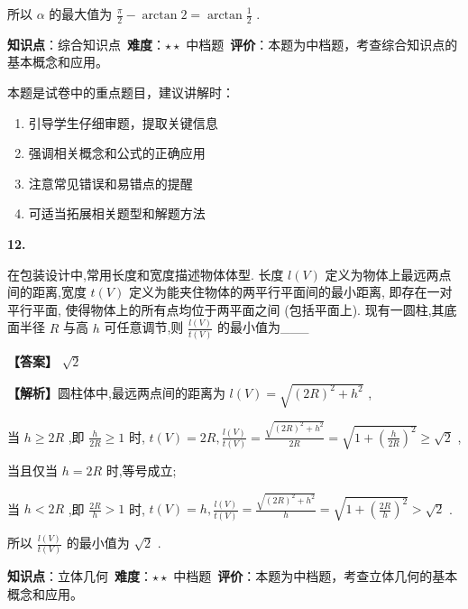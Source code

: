 \documentclass[10pt]{article}
\newenvironment{questionblock}[1]{%
  \needspace{3\baselineskip}%
  \noindent\textbf{#1.}%
}{%
  \par\vspace{1em}%
}
\begin{document}
所以 \(\alpha\) 的最大值为 \(\frac{\pi }{2} - \arctan 2 = \arctan \frac{1}{2}\) .

\begin{analysisbox}[考点分析]
\textbf{知识点}：综合知识点\
\textbf{难度}：$\star\star$ 中档题\
\textbf{评价}：本题为中档题，考查综合知识点的基本概念和应用。
\end{analysisbox}

\begin{tipbox}[教学提示]
本题是试卷中的重点题目，建议讲解时：
\begin{enumerate}
\item 引导学生仔细审题，提取关键信息
\item 强调相关概念和公式的正确应用
\item 注意常见错误和易错点的提醒
\item 可适当拓展相关题型和解题方法
\end{enumerate}
\end{tipbox}

\begin{questionblock}{12}
在包装设计中,常用长度和宽度描述物体体型. 长度 \(l\left( V\right)\) 定义为物体上最远两点间的距离,宽度 \(t\left( V\right)\) 定义为能夹住物体的两平行平面间的最小距离, 即存在一对平行平面, 使得物体上的所有点均位于两平面之间 (包括平面上). 现有一圆柱,其底面半径 \(R\) 与高 \(h\) 可任意调节,则 \(\frac{l\left( V\right) }{t\left( V\right) }\) 的最小值为___
\end{questionblock}

\textbf{【答案】} \(\sqrt{2}\)

\textbf{【解析】}圆柱体中,最远两点间的距离为 \(l\left( V\right)  = \sqrt{{\left( 2R\right) }^{2} + {h}^{2}}\) ,

当 \(h \geq  {2R}\) ,即 \(\frac{h}{2R} \geq  1\) 时, \(t\left( V\right)  = {2R},\frac{l\left( V\right) }{t\left( V\right) } = \frac{\sqrt{{\left( 2R\right) }^{2} + {h}^{2}}}{2R} = \sqrt{1 + {\left( \frac{h}{2R}\right) }^{2}} \geq  \sqrt{2}\) ,

当且仅当 \(h = {2R}\) 时,等号成立;

当 \(h < {2R}\) ,即 \(\frac{2R}{h} > 1\) 时, \(t\left( V\right)  = h,\frac{l\left( V\right) }{t\left( V\right) } = \frac{\sqrt{{\left( 2R\right) }^{2} + {h}^{2}}}{h} = \sqrt{1 + {\left( \frac{2R}{h}\right) }^{2}} > \sqrt{2}\) .

所以 \(\frac{l\left( V\right) }{t\left( V\right) }\) 的最小值为 \(\sqrt{2}\) .

\begin{analysisbox}[考点分析]
\textbf{知识点}：立体几何\
\textbf{难度}：$\star\star$ 中档题\
\textbf{评价}：本题为中档题，考查立体几何的基本概念和应用。
\end{analysisbox}
\end{document}
